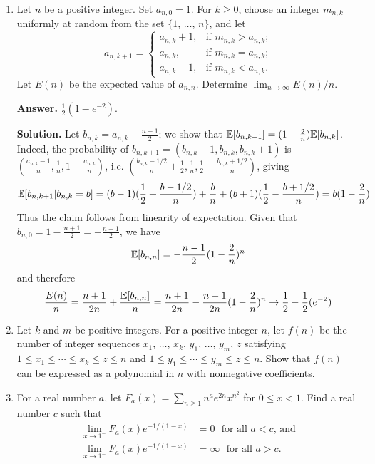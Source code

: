 \documentclass[11pt,a4paper]{article}
\begin{document}
\begin{enumerate}
    	\item [B4.] 
    	Let $n$ be a positive integer. Set $a_{n,0}=1$. For $k\geq 0$, choose an integer $m_{n,k}$ uniformly at random from the set $\{1,\,\ldots,\,n\}$, and let
    	\[
    	a_{n,k+1}=
    	\begin{cases}
    		a_{n,k}+1, & \text{if $m_{n,k}>a_{n,k}$;}\\
    		a_{n,k}, & \text{if $m_{n,k}=a_{n,k}$;}\\
    		a_{n,k}-1, & \text{if $m_{n,k}<a_{n,k}$.}
    	\end{cases}
    	\]Let $E(n)$ be the expected value of $a_{n,n}$. Determine $\lim_{n\to\infty}E(n)/n$.
    	
    	\textbf{Answer.} $\frac 12(1 - e^{-2})$. 
    	
    	\textbf{Solution.} 
    	Let $b_{n, k} = a_{n, k} - \frac{n + 1}{2}$; 
    	we show that ${\mathbb E}[b_{n, k + 1}] = (1 - \frac{2}{n}){\mathbb E}[b_{n,k}]$. 
    	Indeed, the probability of $b_{n, k + 1} = (b_{n, k} - 1, b_{n, k}, b_{n, k} + 1)$ is 
    	$(\frac{a_{n, k} - 1}{n}, \frac 1n, 1 - \frac{a_{n, k}}{n})$, 
    	i.e. $(\frac{b_{n, k} - 1/2}{n} + \frac{1}{2}, \frac 1n, \frac 12 - \frac{b_{n, k} + 1/2}{n})$, 
    	giving 
    	\[{\mathbb E}[b_{n, k + 1}  | b_{n, k} = b]
    	= (b - 1)(\frac 12 + \frac{b - 1/2}{n}) + \frac{b}{n}
    	+ (b + 1)(\frac 12 - \frac{b +1/2}{n})
    	= b(1 - \frac{2}{n})
    	\]
    	Thus the claim follows from linearity of expectation. 
    	Given that $b_{n, 0} = 1 - \frac{n + 1}{2} = -\frac{n - 1}{2}$, we have 
    	\[
    	{\mathbb E}[b_{n, n}] = -\frac{n - 1}{2}(1 - \frac{2}{n})^n
    	\]
    	and therefore 
    	\[
    	\frac{E(n)}{n} = \frac{n+1}{2n} + \frac{{\mathbb E}[b_{n, n}]}{n}
    	= \frac{n+1}{2n} - \frac{n-1}{2n}(1 - \frac{2}{n})^n
    	\to \frac 12 - \frac 12(e^{-2})
    	\]
    	
    	\item [B5.] 
    	Let $k$ and $m$ be positive integers. For a positive integer $n$, let $f(n)$ be the number of integer sequences $x_1,\,\ldots,\,x_k,\,y_1,\,\ldots,\,y_m,\,z$ satisfying $1\leq x_1\leq\cdots\leq x_k\leq z\leq n$ and $1\leq y_1\leq\cdots\leq y_m\leq z\leq n$. Show that $f(n)$ can be expressed as a polynomial in $n$ with nonnegative coefficients.
    	
    	\item [B6.] 
    	For a real number $a$, let $F_a(x)=\sum_{n\geq 1}n^ae^{2n}x^{n^2}$ for $0\leq x<1$. Find a real number $c$ such that
    	\begin{align*}
    		\lim_{x\to 1^-}F_a(x)e^{-1/(1-x)}&=0 \ \ \  \text{for all $a<c$, and}\\
    		\lim_{x\to 1^-}F_a(x)e^{-1/(1-x)}&=\infty \ \ \  \text{for all $a>c$.}
    	\end{align*}
    

\end{enumerate}
\end{document}
